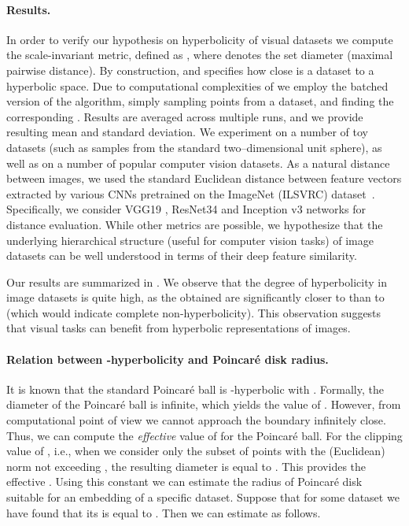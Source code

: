 \documentclass[10pt,twocolumn,letterpaper]{article}
\begin{document}
\paragraph{Results.}
 In order to verify our hypothesis on hyperbolicity of visual datasets we compute the scale-invariant metric, defined as \mbox{}, where  denotes the set diameter (maximal pairwise distance). By construction,  and specifies how close is a dataset to a hyperbolic space. Due to computational complexities of  we employ the batched version of the algorithm, simply sampling  points from a dataset, and finding the corresponding . Results are averaged across multiple runs, and we provide resulting mean and standard deviation. We experiment on a number of toy datasets (such as samples from the standard two--dimensional unit sphere), as well as on a number of popular computer vision datasets. As a natural distance between images, we used the standard Euclidean distance between feature vectors extracted by various CNNs pretrained on the ImageNet (ILSVRC) dataset~\cite{deng2009imagenet}. Specifically, we consider VGG19 \cite{simonyan2014very}, ResNet34 \cite{he2016deep} and Inception v3 \cite{szegedy2015going} networks for  distance evaluation. While other metrics are possible, we hypothesize that the underlying hierarchical structure (useful for computer vision tasks) of image datasets can be well understood in terms of their deep feature similarity.
 




Our results are summarized in . We observe that the degree of hyperbolicity in image datasets is quite high, as the obtained  are significantly closer to  than to  (which would indicate complete non-hyperbolicity). This observation suggests that visual tasks can benefit from hyperbolic representations of images. 

\paragraph{Relation between -hyperbolicity and Poincar\'e disk radius.}
It is known \cite{tifrea2018poincar} that the standard Poincar\'e ball is -hyperbolic with . Formally, the diameter of the Poincar\'e ball is infinite, which yields the  value of . However, from computational point of view we cannot approach the boundary infinitely close. Thus, we can compute the \emph{effective} value of  for the Poincar\'e ball. For the clipping value of , i.e., when we consider only the subset of points with the (Euclidean) norm not exceeding , the resulting diameter is equal to . This provides the effective . Using this constant we can estimate the radius of Poincar\'e disk suitable for an embedding of a specific dataset. Suppose that for some dataset  we have found that its  is equal to . Then we can estimate  as follows. 
\end{document}
